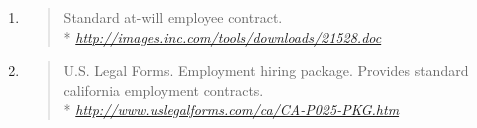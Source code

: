 \documentclass[]{article}
\begin{document}
\begin{enumerate}
  \begin{enumerate}
  \def\labelenumii{\Alph{enumii}.}
  \item
    \begin{quote}
    Standard at-will employee contract. \\*
    \href{http://images.inc.com/tools/downloads/21528.doc}{\emph{http://images.inc.com/tools/downloads/21528.doc}}
    \end{quote}
  \item
    \begin{quote}
    U.S. Legal Forms. Employment hiring package. Provides standard
    california employment contracts. \\*
    \href{http://www.uslegalforms.com/ca/CA-P025-PKG.htm}{\emph{http://www.uslegalforms.com/ca/CA-P025-PKG.htm}}
    \end{quote}


\end{enumerate}
\end{enumerate}
\end{document}
